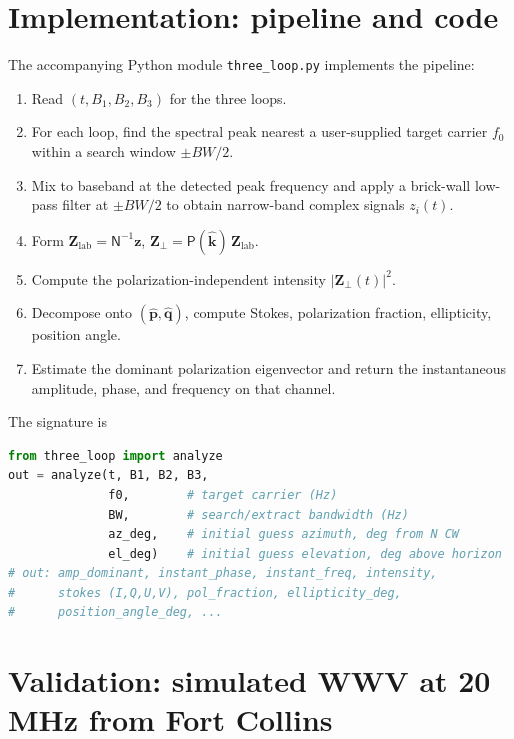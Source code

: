 \documentclass[11pt]{article}
\begin{document}
\section{Implementation: pipeline and code}
\label{sec:pipeline}

The accompanying Python module \texttt{three\_loop.py} implements the
pipeline:
\begin{enumerate}\itemsep=2pt
\item Read $(t, B_1, B_2, B_3)$ for the three loops.
\item For each loop, find the spectral peak nearest a user-supplied
      target carrier $f_0$ within a search window $\pm BW/2$.
\item Mix to baseband at the detected peak frequency and apply a
      brick-wall low-pass filter at $\pm BW/2$ to obtain narrow-band
      complex signals $z_i(t)$.
\item Form $\mathbf{Z}_{\mathrm{lab}} = \mathsf{N}^{-1}\mathbf{z}$,
      $\mathbf{Z}_{\!\perp} = \mathsf{P}(\hat{\mathbf k})\,
      \mathbf{Z}_{\mathrm{lab}}$.
\item Compute the polarization-independent intensity
      $|\mathbf{Z}_{\!\perp}(t)|^2$.
\item Decompose onto $(\hat{\mathbf p},\hat{\mathbf q})$, compute Stokes,
      polarization fraction, ellipticity, position angle.
\item Estimate the dominant polarization eigenvector and return the
      instantaneous amplitude, phase, and frequency on that channel.
\end{enumerate}

\noindent The signature is
\begin{lstlisting}[language=Python]
from three_loop import analyze
out = analyze(t, B1, B2, B3,
              f0,        # target carrier (Hz)
              BW,        # search/extract bandwidth (Hz)
              az_deg,    # initial guess azimuth, deg from N CW
              el_deg)    # initial guess elevation, deg above horizon
# out: amp_dominant, instant_phase, instant_freq, intensity,
#      stokes (I,Q,U,V), pol_fraction, ellipticity_deg,
#      position_angle_deg, ...
\end{lstlisting}

\section{Validation: simulated WWV at 20\,MHz from Fort Collins}
\end{document}
